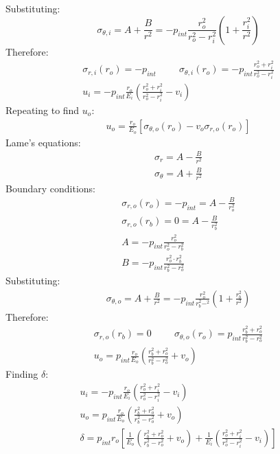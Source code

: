 \documentclass[11pt]{article}
\numberwithin{equation}{section}
\begin{document}
Substituting:
\begin{equation}
    \sigma_{\theta,i} = A + \frac{B}{r^2} = -p_{int}\frac{r_o^2}{r_o^2 - r_i^2} \left(1 + \frac{r_i^2}{r^2}\right)
\end{equation}
Therefore:
\begin{gather}
    \sigma_{r,i}(r_o) = -p_{int} \hspace{1cm} \sigma_{\theta,i}(r_o) = -p_{int}\frac{r_o^2 + r_i^2}{r_o^2 - r_i^2}\\
    u_i = -p_{int} \frac{r_o}{E_i} \left(\frac{r_o^2 + r_i^2}{r_o^2 - r_i^2} - v_i\right)
\end{gather}
Repeating to find $u_o$:
\begin{gather}
    u_o = \frac{r_o}{E_o}\left[\sigma_{\theta,o} (r_o) - v_o \sigma_{r,o}(r_o)\right]
\end{gather}
Lame's equations:
\begin{gather}
    \sigma_r = A - \frac{B}{r^2}\\
    \sigma_{\theta} = A + \frac{B}{r^2}
\end{gather}
Boundary conditions:
\begin{gather}
    \sigma_{r,o}(r_o) = -p_{int} = A - \frac{B}{r_o^2}\\
    \sigma_{r,o}(r_b) = 0 = A - \frac{B}{r_b^2}\\
    A = -p_{int} \frac{r_o^2}{r_o^2- r_b^2}\\
    B = -p_{int} \frac{r_o^2 \cdot r_b^2}{r_b^2 - r_o^2}
\end{gather}
Substituting:
\begin{gather}
    \sigma_{\theta,o} = A + \frac{B}{r^2} = -p_{int} \frac{r_o^2}{r_b^2 - ^2} \left(1+ \frac{r_b^2}{r^2}\right)
\end{gather}
Therefore:
\begin{gather}
    \sigma_{r,o}(r_b) = 0 \hspace{1cm} \sigma_{\theta,o}(r_o) = p_{int}\frac{r_b^2 + r_o^2}{r_b^2 -r_o^2}\\
    u_o = p_{int} \frac{r_o}{E_o}\left(\frac{r_b^2 + r_o^2}{r_b^2 - r_o^2} + v_o\right)
\end{gather}
Finding $\delta$:
\begin{gather}
    u_i =-p_{int}\frac{r_o}{E_i}\left(\frac{r_o^2 + r_i^2 }{r_o^2 - r_i^2}-v_i\right)\\
    u_o = p_{int}\frac{r_o}{E_o}\left(\frac{r_b^2 + r_o^2 }{r_b^2 - r_o^2}+v_o\right)\\
    \delta = p_{int}r_o\left[\frac{1}{E_o}\left(\frac{r_b^2 + r_o^2}{r_b^2 - r_o^2}+v_o\right) + \frac{1}{E_i}\left(\frac{r_o^2 + r_i^2}{r_o^2 - r_i^2}-v_i\right)\right]
\end{gather}
\end{document}
